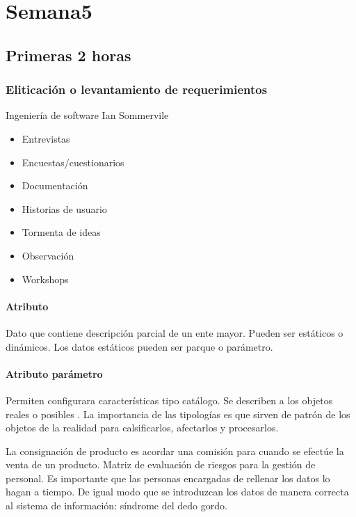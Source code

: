 \section*{Semana5}
\justifying

\subsection*{Primeras 2 horas}

\subsubsection*{Eliticación o levantamiento de requerimientos}

Ingeniería de software Ian Sommervile

\begin{itemize}
\item Entrevistas
\item Encuestas/cuestionarios
\item Documentación
\item Historias de usuario
\item Tormenta de ideas
\item Observación
\item Workshops
\end{itemize}

\paragraph*{Atributo} Dato que contiene descripción parcial de un ente mayor. Pueden ser estáticos o dinámicos. Los datos estáticos pueden ser parque o parámetro. 

\paragraph*{Atributo parámetro} Permiten configurara características tipo catálogo. Se describen a los objetos reales o posibles
. La importancia de las tipologías es que sirven de patrón de los objetos de la realidad para calsificarlos, afectarlos y procesarlos.

La consignación de producto es acordar una comisión para cuando se efectúe la venta de un producto. 
Matriz de evaluación de riesgos para la gestión de personal. Es importante que las personas 
encargadas de rellenar los datos lo hagan a tiempo. De igual modo que se introduzcan los datos de manera correcta 
al sistema de información: síndrome del dedo gordo. 


